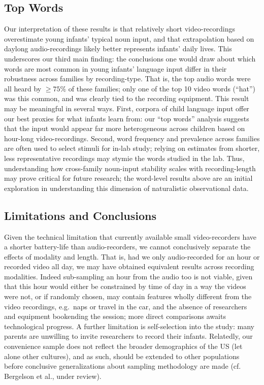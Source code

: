 \documentclass[man]{apa6}
\theoremstyle{definition}
\theoremstyle{definition}
\theoremstyle{definition}
\theoremstyle{remark}
\begin{document}
\subsection{Top Words}\label{top-words}

Our interpretation of these results is that relatively short
video-recordings overestimate young infants' typical noun input, and
that extrapolation based on daylong audio-recordings likely better
represents infants' daily lives. This underscores our third main
finding: the conclusions one would draw about which words are most
common in young infants' language input differ in their robustness
across families by recording-type. That is, the top audio words were all
heard by \(\geq 75\%\) of these families; only one of the top 10 video
words (\enquote{hat}) was this common, and was clearly tied to the
recording equipment. This result may be meaningful in several ways.
First, corpora of child language input offer our best proxies for what
infants learn from: our \enquote{top words} analysis suggests that the
input would appear far more heterogeneous across children based on
hour-long video-recordings. Second, word frequency and prevalence across
families are often used to select stimuli for in-lab study; relying on
estimates from shorter, less representative recordings may stymie the
words studied in the lab. Thus, understanding how cross-family
noun-input stability scales with recording-length may prove critical for
future research; the word-level results above are an initial exploration
in understanding this dimension of naturalistic observational data.

\subsection{Limitations and
Conclusions}\label{limitations-and-conclusions}

Given the technical limitation that currently available small
video-recorders have a shorter battery-life than audio-recorders, we
cannot conclusively separate the effects of modality and length. That
is, had we only audio-recorded for an hour or recorded video all day, we
may have obtained equivalent results across recording modalities. Indeed
sub-sampling an hour from the audio too is not viable, given that this
hour would either be constrained by time of day in a way the videos were
not, or if randomly chosen, may contain features wholly different from
the video recordings, e.g.~naps or travel in the car, and the absence of
researchers and equipment bookending the session; more direct
comparisons awaits technological progress. A further limitation is
self-selection into the study: many parents are unwilling to invite
researchers to record their infants. Relatedly, our convenience sample
does not reflect the broader demographics of the US (let alone other
cultures), and as such, should be extended to other populations before
conclusive generalizations about sampling methodology are made (cf.
Bergelson et al., under review).
\end{document}
